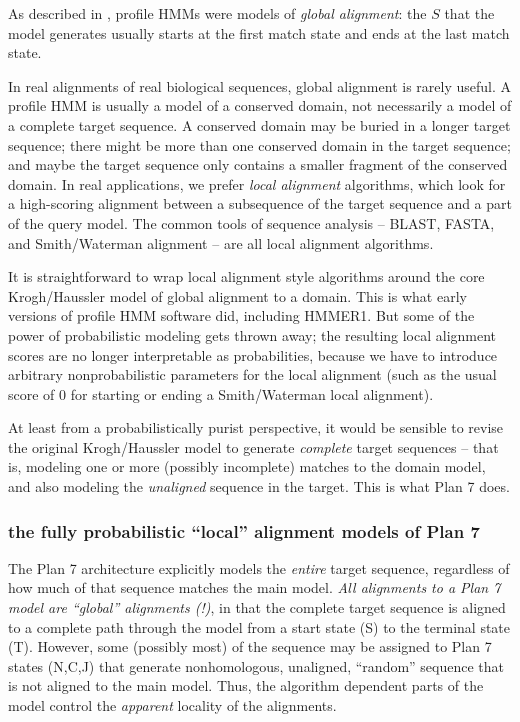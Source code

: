 As described in \cite{Krogh94}, profile HMMs were models of
\emph{global alignment}: the $S$ that the model generates usually
starts at the first match state and ends at the last match state.

In real alignments of real biological sequences, global alignment is
rarely useful. A profile HMM is usually a model of a conserved domain,
not necessarily a model of a complete target sequence. A conserved
domain may be buried in a longer target sequence; there might be more
than one conserved domain in the target sequence; and maybe the target
sequence only contains a smaller fragment of the conserved domain. In
real applications, we prefer \emph{local alignment} algorithms, which
look for a high-scoring alignment between a subsequence of the target
sequence and a part of the query model. The common tools of sequence
analysis -- BLAST, FASTA, and Smith/Waterman alignment -- are all
local alignment algorithms.

It is straightforward to wrap local alignment style algorithms around
the core Krogh/Haussler model of global alignment to a domain.  This
is what early versions of profile HMM software did, including
HMMER1. But some of the power of probabilistic modeling gets thrown
away; the resulting local alignment scores are no longer interpretable
as probabilities, because we have to introduce arbitrary
nonprobabilistic parameters for the local alignment (such as the usual
score of 0 for starting or ending a Smith/Waterman local alignment).

At least from a probabilistically purist perspective, it would be
sensible to revise the original Krogh/Haussler model to generate
\emph{complete} target sequences -- that is, modeling one or more
(possibly incomplete) matches to the domain model, and also modeling
the \emph{unaligned} sequence in the target. This is what Plan 7 does.

\subsubsection{the fully probabilistic ``local'' alignment models of Plan 7}

The Plan 7 architecture explicitly models the \emph{entire} target
sequence, regardless of how much of that sequence matches the main
model. \emph{All alignments to a Plan 7 model are ``global''
alignments (!)}, in that the complete target sequence is aligned to a
complete path through the model from a start state (S) to the terminal
state (T).  However, some (possibly most) of the sequence may be
assigned to Plan 7 states (N,C,J) that generate nonhomologous,
unaligned, ``random'' sequence that is not aligned to the main model.
Thus, the algorithm dependent parts of the model control the
\textit{apparent} locality of the alignments.

